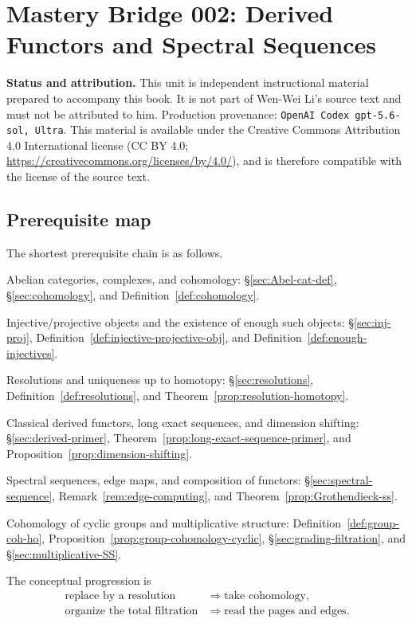
\section*{Mastery Bridge 002: Derived Functors and Spectral Sequences}
\hypertarget{o014.mastery.derived-spectral.002}{ }
\label{mastery:derived-spectral-002}

\noindent\textbf{Status and attribution.}
This unit is independent instructional material prepared to accompany this
book. It is not part of Wen-Wei Li's source text and must not be attributed to
him. Production provenance:
\texttt{OpenAI Codex gpt-5.6-sol, Ultra}. This material is available under the
Creative Commons Attribution 4.0 International license
(CC BY 4.0; \url{https://creativecommons.org/licenses/by/4.0/}), and is
therefore compatible with the license of the source text.

\subsection*{Prerequisite map}

The shortest prerequisite chain is as follows.
\begin{compactitem}
	\item Abelian categories, complexes, and cohomology:
	\S\ref{sec:Abel-cat-def}, \S\ref{sec:cohomology}, and
	Definition~\ref{def:cohomology}.
	\item Injective/projective objects and the existence of enough such
	objects:
	\S\ref{sec:inj-proj}, Definition~\ref{def:injective-projective-obj}, and
	Definition~\ref{def:enough-injectives}.
	\item Resolutions and uniqueness up to homotopy:
	\S\ref{sec:resolutions}, Definition~\ref{def:resolutions}, and
	Theorem~\ref{prop:resolution-homotopy}.
	\item Classical derived functors, long exact sequences, and dimension
	shifting: \S\ref{sec:derived-primer},
	Theorem~\ref{prop:long-exact-sequence-primer}, and
	Proposition~\ref{prop:dimension-shifting}.
	\item Spectral sequences, edge maps, and composition of functors:
	\S\ref{sec:spectral-sequence}, Remark~\ref{rem:edge-computing}, and
	Theorem~\ref{prop:Grothendieck-ss}.
	\item Cohomology of cyclic groups and multiplicative structure:
	Definition~\ref{def:group-coh-ho},
	Proposition~\ref{prop:group-cohomology-cyclic},
	\S\ref{sec:grading-filtration}, and
	\S\ref{sec:multiplicative-SS}.
\end{compactitem}
The conceptual progression is
\[
	\begin{aligned}
	\text{replace by a resolution}
	&\Longrightarrow \text{take cohomology},\\
	\text{organize the total filtration}
	&\Longrightarrow \text{read the pages and edges}.
	\end{aligned}
\]

